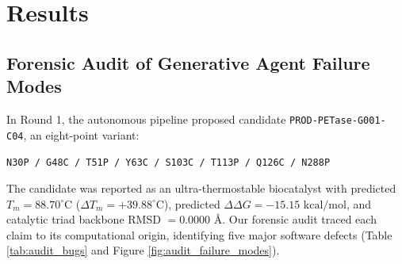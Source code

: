 \documentclass[11pt,a4paper]{article}
\begin{document}
\section{Results}

\subsection{Forensic Audit of Generative Agent Failure Modes}
In Round 1, the autonomous pipeline proposed candidate \texttt{PROD-PETase-G001-C04}, an eight-point variant:
\begin{center}
\texttt{N30P / G48C / T51P / Y63C / S103C / T113P / Q126C / N288P}
\end{center}
The candidate was reported as an ultra-thermostable biocatalyst with predicted $T_m = 88.70^\circ\text{C}$ ($\Delta T_m = +39.88^\circ\text{C}$), predicted $\Delta\Delta G = -15.15\text{ kcal/mol}$, and catalytic triad backbone RMSD $= 0.0000\text{ \AA}$. Our forensic audit traced each claim to its computational origin, identifying five major software defects (Table \ref{tab:audit_bugs} and Figure \ref{fig:audit_failure_modes}).
\end{document}
